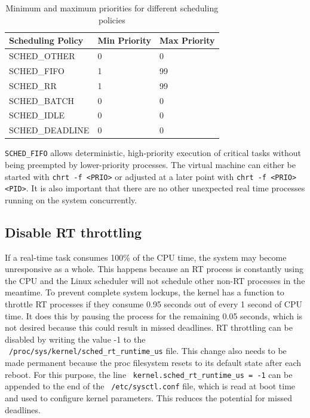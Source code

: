 \documentclass[MMR,Master,english]{twbook}
\begin{document}
\begin{table}[H]
	\centering
	\caption{Minimum and maximum priorities for different scheduling policies}
	\label{tab:scheduling_priorities}
	\setlength{\tabcolsep}{0.5em} %
	{\renewcommand{\arraystretch}{1.2}%
	\begin{tabular}{|l|l|l|}
	\hline
	\textbf{Scheduling Policy} & \textbf{Min Priority} & \textbf{Max Priority} \\ \hline
	SCHED\_OTHER               & 0                     & 0                     \\ \hline
	SCHED\_FIFO                & 1                     & 99                    \\ \hline
	SCHED\_RR                  & 1                     & 99                    \\ \hline
	SCHED\_BATCH               & 0                     & 0                     \\ \hline
	SCHED\_IDLE                & 0                     & 0                     \\ \hline
	SCHED\_DEADLINE            & 0                     & 0                     \\ \hline
	\end{tabular}}
	\end{table}
	
\noindent \texttt{SCHED\_FIFO} allows deterministic, high-priority execution of critical tasks without being preempted by lower-priority processes. The virtual machine can either be started with \texttt{chrt -f <PRIO>} or adjusted at a later point with \texttt{chrt -f <PRIO> <PID>}. It is also important that there are no other unexpected real time processes running on the system concurrently.
\subsection{Disable RT throttling}
If a real-time task consumes 100\% of the CPU time, the system may become unresponsive as a whole. This happens because an RT process is constantly using the CPU and the Linux scheduler will not schedule other non-RT processes in the meantime. To prevent complete system lockups, the kernel has a function to throttle RT processes if they consume 0.95 seconds out of every 1 second of CPU time. It does this by pausing the process for the remaining 0.05 seconds, which is not desired because this could result in missed deadlines. RT throttling can be disabled by  writing the value -1 to the ~\texttt{/proc/sys/kernel/sched\_rt\_runtime\_us} file. This change also needs to be made permanent because the proc filesystem resets to its default state after each reboot. For this purpose, the line ~\texttt{kernel.sched\_rt\_runtime\_us = -1} can be appended to the end of the ~\texttt{/etc/sysctl.conf} file, which is read at boot time and used to configure kernel parameters. This reduces the potential for missed deadlines. 
\end{document}
